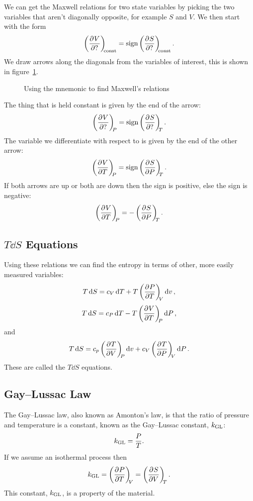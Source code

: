     We can get the Maxwell relations for two state variables by picking the two variables that aren't diagonally opposite, for example \(S\) and \(V\).
    We then start with the form
    \[\left(\pdv[]{V}{?}\right)_{\!\!{\text{const}}} = \text{sign}\left(\pdv[]{S}{?}\right)_{\!\!{\text{const}}}.\]
    We draw arrows along the diagonals from the variables of interest, this is shown in figure~\ref{fig:mnemonic maxwell relations}.
    \begin{figure}[ht]
        \centering
        \caption{Using the mnemonic to find Maxwell's relations}
        \label{fig:mnemonic maxwell relations}
    \end{figure}
    The thing that is held constant is given by the end of the arrow:
    \[\left(\pdv[]{V}{?}\right)_{\!\!{P}} = \text{sign}\left(\pdv[]{S}{?}\right)_{\!\!{T}}.\]
    The variable we differentiate with respect to is given by the end of the other arrow:
    \[\left(\pdv[]{V}{T}\right)_{\!\!{P}} = \text{sign}\left(\pdv[]{S}{P}\right)_{\!\!{T}}.\]
    If both arrows are up or both are down then the sign is positive, else the sign is negative:
    \[\left(\pdv[]{V}{T}\right)_{\!\!{P}} = -\left(\pdv[]{S}{P}\right)_{\!\!{T}}.\]
    
    \subsection{\texorpdfstring{\(T\dd{S}\)}{TdS} Equations}
    Using these relations we can find the entropy in terms of other, more easily measured variables:
    \[T\dd{S} = c_V\dd{T} + T\left(\pdv[]{P}{T}\right)_{\!\!{V}}\dd{v},\]
    \[T\dd{S} = c_P\dd{T} - T\left(\pdv[]{V}{T}\right)_{\!\!{P}}\dd{P},\]
    and
    \[T\dd{S} = c_p\left(\pdv[]{T}{V}\right)_{\!\!{P}}\dd{v} + c_V\left(\pdv[]{T}{P}\right)_{\!\!{V}}\dd{P}.\]
    These are called the \(T\dd{S}\) equations.
    
    \subsection{Gay--Lussac Law}
    The Gay--Lussac law, also known as Amonton's law, is that the ratio of pressure and temperature is a constant, known as the Gay--Lussac constant, \(k_\mathrm{GL}\):
    \[k_\mathrm{GL} = \frac{P}{T}.\]
    If we assume an isothermal process then
    \[k_\mathrm{GL} = \left(\pdv[]{P}{T}\right)_{\!\!{V}} = \left(\pdv[]{S}{V}\right)_{\!\!{T}}.\]
    This constant, \(k_\mathrm{GL}\), is a property of the material.
    
